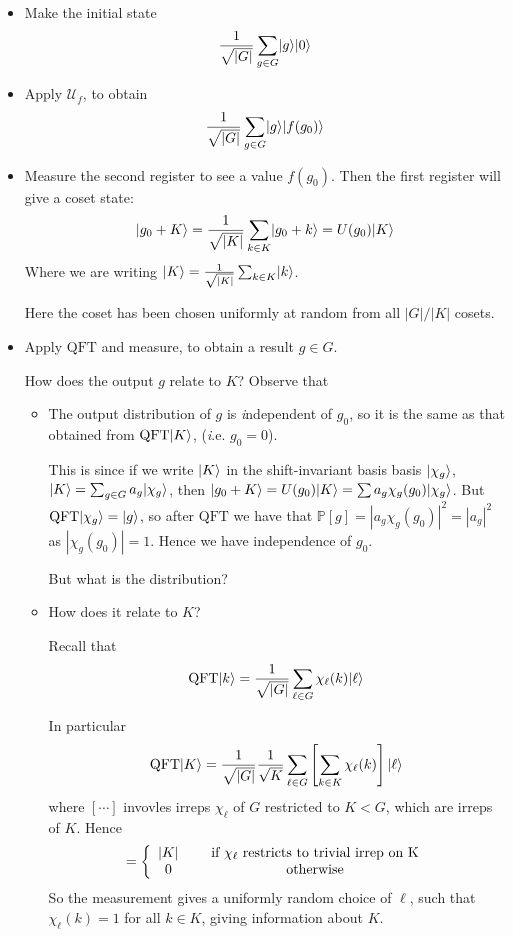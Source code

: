 \documentclass[]{article}
\DeclarePairedDelimiter\ket{\lvert}{\rangle}
\theoremstyle{custhm}
\theoremstyle{cusdef}
\theoremstyle{custhm}
\theoremstyle{custhm}
\theoremstyle{custhm}
\theoremstyle{custhm}
\theoremstyle{cusdef}
\theoremstyle{remark}
\renewcommand{\P}{\mathbb{P}}
\renewcommand{\it}[1]{\textit{#1}}
\newcommand{\qft}{\textrm{QFT}}
\begin{document}
\begin{itemize}
	\item Make the initial state
	\begin{align*}
		\frac{1}{\sqrt{|G|}}\sum_{g\in G} \ket{g}\ket{0}
	\end{align*}
	\item Apply $\mathcal{U}_f$, to obtain
	\begin{align*}
		\frac{1}{\sqrt{|G|}}\sum_{g\in G}\ket{g}\ket{f(g_0)}
	\end{align*}
	\item Measure the second register to see a value $f(g_0)$. Then the first register will give a coset state:
	\begin{align*}
		\ket{g_0 + K} = \frac{1}{\sqrt{|K|}} \sum_{k\in K}\ket{g_0 + k} = U(g_0)\ket{K}
	\end{align*}
	Where we are writing $\ket{K} = \frac{1}{\sqrt{|K|}}\sum_{k\in K}\ket{k}$.
	
	Here the coset has been chosen uniformly at random from all $|G|/|K|$ cosets.
	
	\item Apply $\qft$ and measure, to obtain a result $g\in G$.
	
	How does the output $g$ relate to $K$? Observe that
	\begin{itemize}
		\item The output distribution of $g$ is {\it independent} of $g_0$, so it is the same as that obtained from $\qft\ket{K}$, ({\it i.e.} $g_0 = 0$).
		
		This is since if we write $\ket{K}$ in the shift-invariant basis basis $\ket{\chi_g}$, $\ket{K} = \sum_{g\in G}a_g \ket{\chi_g}$, then $\ket{g_0+K} = U(g_0)\ket{K} = \sum a_g\chi_g(g_0)\ket{\chi_g}$. But $\qft \ket{\chi_g} = \ket{g}$, so after $\qft$ we have that $\P[g] = |a_g\chi_g(g_0)|^2 = |a_g|^2$ as $|\chi_g(g_0)| = 1$. Hence we have independence of $g_0$.
		
		But what is the distribution?
		
		\item How does it relate to $K$?
		
		Recall that $$\qft\ket{k} = \frac{1}{\sqrt{|G|}} \sum_{\ell \in G} \chi_{\ell}(k)\ket{\ell}$$
		
		In particular
		\begin{align*}
			\qft\ket{K} = \frac{1}{\sqrt{|G|}} \frac{1}{\sqrt{K}} \sum_{\ell \in G} \left[\sum_{k\in K}\chi_{\ell}(k)\right] \ket{\ell}
		\end{align*}
	where $[\cdots]$ invovles irreps $\chi_\ell$ of $G$ restricted to $K < G$, which are irreps of $K$. Hence
	\begin{align*}
		[\cdots] = \left\lbrace \begin{array}{cc} |K|&\quad \textrm{ if }\chi_{\ell}\textrm{ restricts to trivial irrep on }$K$ \\ 0&\quad \textrm{ otherwise}\end{array}  \right.
	\end{align*}
So the measurement gives a uniformly random choice of $\ell$, such that $\chi_{\ell}(k) = 1$ for all $k \in K$, giving information about $K$.


\end{itemize}
\end{itemize}
\end{document}
